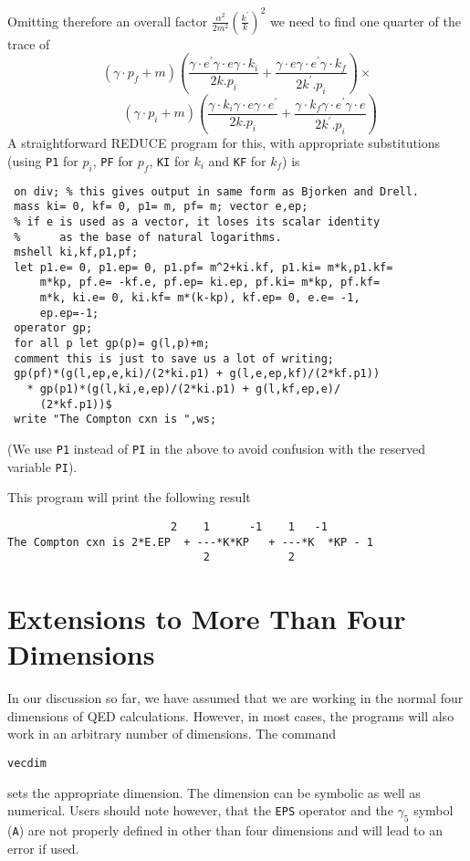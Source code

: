 Omitting therefore an overall factor
$\displaystyle\frac{\alpha^2}{2m^2}\left(\frac{k^\prime}{k}\right)^2$ we need to find one quarter of the trace of
\[
 \left( \gamma\cdot p_f + m\right)
 \left(\frac{\gamma\cdot e^\prime \gamma\cdot e\gamma\cdot k_i}{2k.p_i} +
  \frac{\gamma\cdot e\gamma\cdot e^\prime \gamma\cdot k_f}{2k^\prime.p_i}\right)\times
\]
\[
 \qquad\left(
  \gamma\cdot p_i + m\right)
 \left(\frac{\gamma\cdot k_i\gamma\cdot e\gamma\cdot e^\prime}{2k.p_i} +
  \frac{\gamma\cdot k_f\gamma\cdot e^\prime \gamma\cdot e}{2k^\prime.p_i}\right) 
\]
A straightforward REDUCE program for this, with appropriate substitutions
(using \texttt{P1} for $p_i$, \texttt{PF} for $p_f$, \texttt{KI}
for $k_i$ and \texttt{KF} for $k_f$) is
\begin{verbatim}
 on div; % this gives output in same form as Bjorken and Drell.
 mass ki= 0, kf= 0, p1= m, pf= m; vector e,ep;
 % if e is used as a vector, it loses its scalar identity
 %      as the base of natural logarithms.
 mshell ki,kf,p1,pf;
 let p1.e= 0, p1.ep= 0, p1.pf= m^2+ki.kf, p1.ki= m*k,p1.kf=
     m*kp, pf.e= -kf.e, pf.ep= ki.ep, pf.ki= m*kp, pf.kf=
     m*k, ki.e= 0, ki.kf= m*(k-kp), kf.ep= 0, e.e= -1,
     ep.ep=-1;
 operator gp;
 for all p let gp(p)= g(l,p)+m;
 comment this is just to save us a lot of writing;
 gp(pf)*(g(l,ep,e,ki)/(2*ki.p1) + g(l,e,ep,kf)/(2*kf.p1))
   * gp(p1)*(g(l,ki,e,ep)/(2*ki.p1) + g(l,kf,ep,e)/
     (2*kf.p1))$
 write "The Compton cxn is ",ws;
\end{verbatim}

(We use \texttt{P1} instead of \texttt{PI} in the above to avoid confusion with
the reserved variable \texttt{PI}).

This program will print the following result
\begin{verbatim}
                         2    1      -1    1   -1
The Compton cxn is 2*E.EP  + ---*K*KP   + ---*K  *KP - 1
                              2            2
\end{verbatim}

\section{Extensions to More Than Four Dimensions}
\hypertarget{command:VECDIM}{}

In our discussion so far, we have assumed that we are working in the
normal four dimensions of QED calculations. However, in most cases, the
programs will also work in an arbitrary number of dimensions. The command
\begin{syntax}
  \texttt{vecdim }
\end{syntax}
sets the appropriate dimension. The dimension can be symbolic as well as
numerical. Users should note however, that the \texttt{EPS} operator and the
$\gamma_{5}$ symbol (\texttt{A}) are not properly defined in other than four
dimensions and will lead to an error if used.

